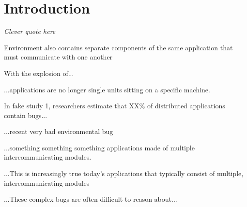 \section{Introduction}
\label{SEC:introduction}

\textit{Clever quote here}


Environment also contains separate components of the same application
that must communicate with one another

With the explosion of...

...applications are no longer single units sitting on a specific machine.

In fake study 1, researchers estimate that XX\% of distributed applications
contain bugs...

...recent very bad environmental bug~\cite{devzeroroot}



...something something something applications made of multiple
intercommunicating modules.


...This is increasingly true today's applications that typically consist of
multiple, intercommunicating modules


...These complex bugs are often difficult to reason about...



